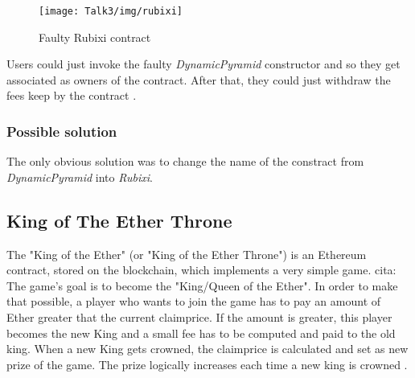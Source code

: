 \begin{figure}[H]
\begin{center}
\texttt{[image: Talk3/img/rubixi]}
\end{center}
\caption{Faulty Rubixi contract}
\label{label}
\end{figure}

Users could just invoke the faulty \textit{DynamicPyramid} constructor and so they get associated as owners of the contract. After that, they could just withdraw the fees keep by the contract \cite{rubixi1}. 

\subsubsection{Possible solution}
The only obvious solution was to change the name of the constract from \textit{DynamicPyramid} into \textit{Rubixi}.


\subsection{King of The Ether Throne}
The "King of the Ether" (or "King of the Ether Throne") is an Ethereum contract, stored on the blockchain, which implements a very simple game. cita: %
The game's goal is to become the "King/Queen of the Ether". In order to make that possible, a player who wants to join the game has to pay an amount of Ether greater that the current claimprice. If the amount is greater, this player becomes the new King and a small fee has to be computed and paid to the old king. 
When a new King gets crowned, the claimprice is calculated and set as new prize of the game. The prize logically increases each time a new king is crowned \cite{paper2}. \\

